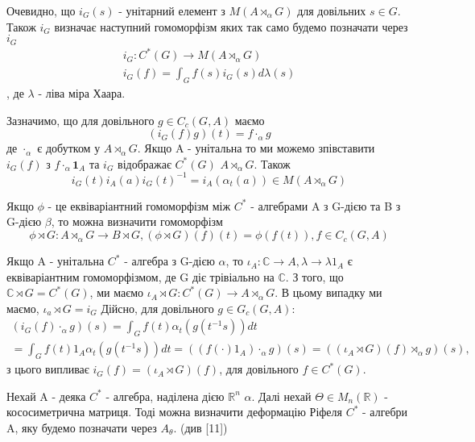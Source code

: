 \begin{remark}
    Очевидно, що $i_G(s)$ - унітарний елемент з $M(A \rtimes_\alpha G)$ для
    довільних $s \in G$.
    Також $i_G$ визначає наступний гомоморфізм яких так само будемо позначати
    через $i_G$
    \begin{align*}
        i_G: C^*(G) \to M(A \rtimes_\alpha G) \\
        i_G(f) = \int_G f(s)i_G(s) d\lambda(s)
    \end{align*}
    , де $\lambda$ - ліва міра Хаара.
\end{remark}

Зазначимо, що для довільного $g \in C_c(G,A)$ маємо
\begin{equation*}
    (i_G(f)g)(t) = f \cdot_\alpha g
\end{equation*}
де $\cdot_\alpha$ є добутком у $A \rtimes_\alpha G$.
Якщо A - унітальна то ми можемо зпівставити $i_G(f)$ з $f \cdot_\alpha \mathbf{1}_A$
та $i_G$ відображає $C^*(G)$ $A \rtimes_\alpha G$.
Також
\begin{equation*}
    i_G(t)i_A(a)i_G(t)^{-1} = i_A(\alpha_t(a)) \in M(A \rtimes_\alpha G)
\end{equation*}

Якщо $\phi$ - це еквіваріантний гомоморфізм між $C^*$ - алгебрами A з G-дією
\alpha та B з G-дією $\beta$, то можна визначити гомоморфізм
\begin{equation*}
    \phi \rtimes G: A \rtimes_\alpha G \to B \rtimes G, (\phi \rtimes G)(f)(t) = \phi(f(t)), f \in C_c(G,A)
\end{equation*}

Якщо A - унітальна $C^*$ - алгебра з G-дією $\alpha$, то $\iota_A: \mathbb{C} \to A, \lambda \to \lambda 1_A$
є еквіваріантним гомоморфізмом, де G діє трівіально на $\mathbb{C}$.
З того, що $\mathbb{C} \rtimes G = C^*(G)$, ми маємо
$\iota_A \rtimes G: C^*(G) \to A \rtimes_\alpha G$.
В цьому випадку ми маємо,
$\iota_a \rtimes G = i_G$
Дійсно, для довільного $g \in G_c(G,A)$:
\begin{multline*}
    (i_G(f) \cdot_\alpha g)(s) = \int_G f(t)\alpha_t(g(t^{-1}s))dt \\
    = \int_G f(t)1_A\alpha_t(g(t^{-1}s))dt
    = ((f(\cdot)1_A)\cdot_\alpha g)(s) = ((\iota_A \rtimes G)(f) \rtimes_\alpha g)(s),
\end{multline*}
з цього випливає $i_G(f) = (\iota_A \rtimes G)(f)$, для довільного $f \in C^*(G)$.

Нехай A - деяка $C^*$ - алгебра, наділена дією $\mathbb{R}^n$ $\alpha$.
Далі нехай $\Theta \in M_n(\mathbb{R})$ - кососиметрична матриця.
Тоді можна визначити деформацію Ріфеля $C^*$ - алгебри A, яку будемо
позначати через $A_\theta$. (див [11])


